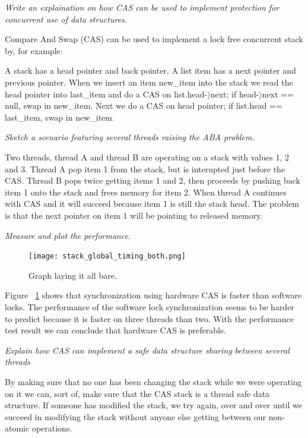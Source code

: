 \documentclass[a4paper,12pt]{article}
\begin{document}
\begin{itemize}
\item \textit{Write an explaination on how CAS can be used to implement protection for concurrent use of data structures.}

  Compare And Swap (CAS) can be used to implement a lock free concurrent stack by, for example:

  A stack has a head pointer and back pointer. A list item has a next pointer and previous pointer. When we insert an item new\_item into the stack we read the head pointer into last\_item and do a CAS on list.head-$\rangle$next; if head-$\rangle$next == null, swap in new\_item. Next we do a CAS on head pointer; if list.head == last\_item, swap in new\_item.

\item \textit{Sketch a scenario featuring several threads raising the ABA problem.}

Two threads, thread A and thread B are operating on a stack with values 1, 2 and 3. Thread A pop item 1 from the stack, but is interupted just before the CAS. Thread B pops twice getting items 1 and 2, then proceeds by pushing back item 1 onto the stack and frees memory for item 2. When thread A continues with CAS and it will succeed because item 1 is still the stack head. The problem is that the next pointer on item 1 will be pointing to released memory.

\begin{minipage}{\textwidth}
\item \textit{Measure and plot the performance.}

\begin{figure}[H]
  \centering
  \texttt{[image: stack\_global\_timing\_both.png]}
  \caption{Graph laying it all bare.}
  \label{fig:stacktiming}
\end{figure}

Figure ~\ref{fig:stacktiming} shows that synchronization using hardware CAS is faster than software locks. The performance of the software lock synchronization seems to be harder to predict because it is faster on three threads than two. With the performance test result we can conclude that hardware CAS is preferable. 

\end{minipage}

\item \textit{Explain how CAS can implement a safe data structure sharing between several threads}

By making sure that no one has been changing the stack while we were operating on it we can, sort of, make sure that the CAS stack is a thread safe data structure. If someone has modified the stack, we try again, over and over until we succeed in modifying the stack without anyone else getting between our non-atomic operations.


\end{itemize}
\end{document}
